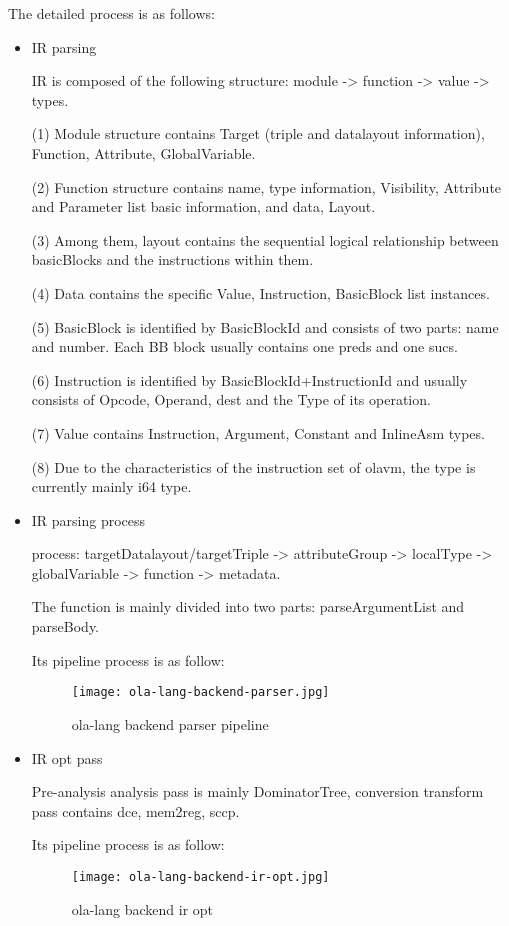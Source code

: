 The detailed process is as follows:
    \begin{itemize}
        \item IR parsing

IR is composed of the following structure: module -> function -> value -> types.

(1) Module structure contains Target (triple and datalayout information), Function, Attribute, GlobalVariable.

(2) Function structure contains name, type information, Visibility, Attribute and Parameter list basic information, and data, Layout.

(3) Among them, layout contains the sequential logical relationship between basicBlocks and the instructions within them.

(4) Data contains the specific Value, Instruction, BasicBlock list instances.

(5) BasicBlock is identified by BasicBlockId and consists of two parts: name and number. Each BB block usually contains one preds and one sucs.

(6) Instruction is identified by BasicBlockId+InstructionId and usually consists of Opcode, Operand, dest and the Type of its operation.

(7) Value contains Instruction, Argument, Constant and InlineAsm types.

(8) Due to the characteristics of the instruction set of olavm, the type is currently mainly i64 type.

        \item IR parsing process

process: targetDatalayout/targetTriple -> attributeGroup -> localType -> globalVariable -> function -> metadata.

The function is mainly divided into two parts: parseArgumentList and parseBody.

Its pipeline process is as follow:
\begin{figure}[!htbp]
    \centering
    \texttt{[image: ola-lang-backend-parser.jpg]}
    \caption{ola-lang backend parser pipeline}
    \label{fig:ola-lang-backend-parser}
\end{figure}

        \item IR opt pass

Pre-analysis analysis pass is mainly DominatorTree, conversion transform pass contains dce, mem2reg, sccp.

Its pipeline process is as follow:
\begin{figure}[!htbp]
    \centering
    \texttt{[image: ola-lang-backend-ir-opt.jpg]}
    \caption{ola-lang backend ir opt}
    \label{fig:ola-lang-backend-ir-opt}
\end{figure}


\end{itemize}
